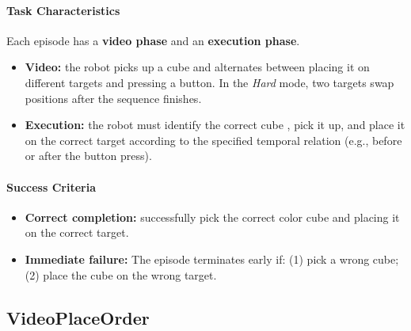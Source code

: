 \paragraph{Task Characteristics}
Each episode has a \textbf{video phase} and an \textbf{execution phase}.
\begin{itemize}[itemsep=1pt, topsep=0pt, leftmargin=*]
    \item \textbf{Video:} the robot picks up a cube and alternates between placing it on different targets and pressing a button. In the \textit{Hard} mode, two targets swap positions after the sequence finishes.
    \item \textbf{Execution:} the robot must identify the correct cube , pick it up, and place it on the correct target according to the specified temporal relation (e.g., before or after the button press).
\end{itemize}


\paragraph{Success Criteria}
\begin{itemize}[itemsep=1pt, topsep=0pt, leftmargin=*]
    \item \textbf{Correct completion:} successfully pick the correct color cube and placing it on the correct target.
\item \textbf{Immediate failure:} The episode terminates early if: (1) pick a wrong cube; (2) place the cube on the wrong target.
\end{itemize}

\clearpage



\subsection{VideoPlaceOrder}
\label{sec:task_videoplaceorder}

\begin{table}
    \centering
    \vspace{-0.5cm}
    \caption{\textit{VideoPlaceOrder} Task Configuration.}
        \vspace{-0.2cm}
    \label{tab:videoplaceorder_difficulty_config}
    \renewcommand{\arraystretch}{1.2}
   {}
    \vspace{-0.5cm}
\end{table}

